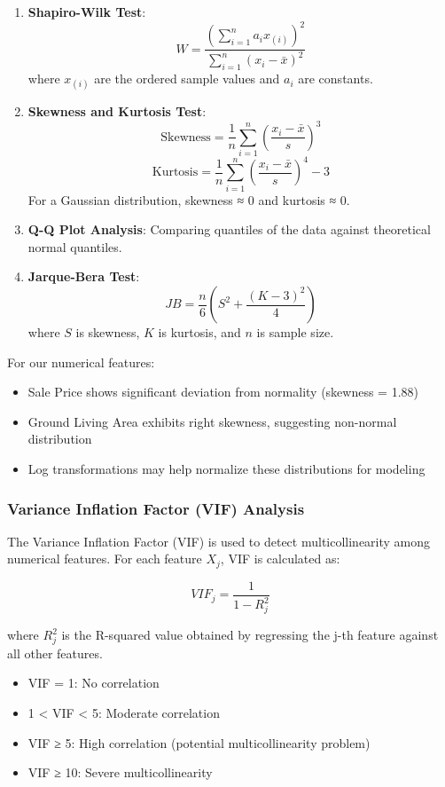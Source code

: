 \documentclass[12pt]{report}
\begin{document}
\begin{enumerate}
    \item \textbf{Shapiro-Wilk Test}:
    \[ W = \frac{(\sum_{i=1}^n a_i x_{(i)})^2}{\sum_{i=1}^n (x_i - \bar{x})^2} \]
    where $x_{(i)}$ are the ordered sample values and $a_i$ are constants.
    
    \item \textbf{Skewness and Kurtosis Test}:
    \[ \text{Skewness} = \frac{1}{n} \sum_{i=1}^n (\frac{x_i - \bar{x}}{s})^3 \]
    \[ \text{Kurtosis} = \frac{1}{n} \sum_{i=1}^n (\frac{x_i - \bar{x}}{s})^4 - 3 \]
    For a Gaussian distribution, skewness ≈ 0 and kurtosis ≈ 0.
    
    \item \textbf{Q-Q Plot Analysis}: Comparing quantiles of the data against theoretical normal quantiles.
    
    \item \textbf{Jarque-Bera Test}:
    \[ JB = \frac{n}{6}(S^2 + \frac{(K-3)^2}{4}) \]
    where $S$ is skewness, $K$ is kurtosis, and $n$ is sample size.
\end{enumerate}

For our numerical features:
\begin{itemize}
    \item Sale Price shows significant deviation from normality (skewness = 1.88)
    \item Ground Living Area exhibits right skewness, suggesting non-normal distribution
    \item Log transformations may help normalize these distributions for modeling
\end{itemize}

\subsubsection{Variance Inflation Factor (VIF) Analysis}
The Variance Inflation Factor (VIF) is used to detect multicollinearity among numerical features. For each feature $X_j$, VIF is calculated as:

\[ VIF_j = \frac{1}{1-R^2_j} \]

where $R^2_j$ is the R-squared value obtained by regressing the j-th feature against all other features. 

\begin{itemize}
    \item VIF = 1: No correlation
    \item 1 < VIF < 5: Moderate correlation
    \item VIF ≥ 5: High correlation (potential multicollinearity problem)
    \item VIF ≥ 10: Severe multicollinearity
\end{itemize}
\end{document}
